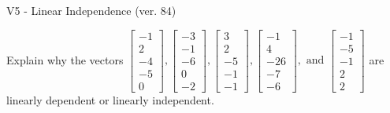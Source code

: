 \begin{exercise}
  \begin{exerciseTitle}V5 - Linear Independence (ver. 84)\end{exerciseTitle}
  \begin{exerciseStatement}
    Explain why the vectors \(\left[\begin{array}{r}
-1 \\
2 \\
-4 \\
-5 \\
0
\end{array}\right] , \left[\begin{array}{r}
-3 \\
-1 \\
-6 \\
0 \\
-2
\end{array}\right] , \left[\begin{array}{r}
3 \\
2 \\
-5 \\
-1 \\
-1
\end{array}\right] , \left[\begin{array}{r}
-1 \\
4 \\
-26 \\
-7 \\
-6
\end{array}\right] , \text{ and } \left[\begin{array}{r}
-1 \\
-5 \\
-1 \\
2 \\
2
\end{array}\right]\) are linearly dependent or linearly independent.	



\end{exerciseStatement}
\end{exercise}
